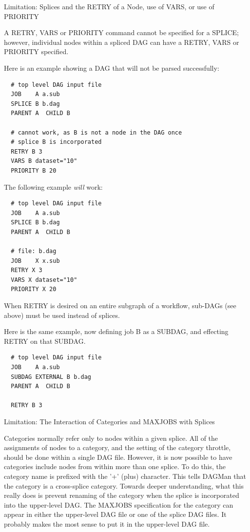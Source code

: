 \begin{description}
\item[Limitation: Splices and the RETRY of a Node, use of VARS, or use of PRIORITY]
\end{description}

A RETRY, VARS or PRIORITY command cannot be specified for a SPLICE;
however, individual nodes within a spliced DAG can have a RETRY, VARS
or PRIORITY specified.

Here is an example showing a DAG that will not be parsed successfully:
\begin{verbatim}
  # top level DAG input file
  JOB    A a.sub
  SPLICE B b.dag
  PARENT A  CHILD B

  # cannot work, as B is not a node in the DAG once
  # splice B is incorporated
  RETRY B 3
  VARS B dataset="10"
  PRIORITY B 20
\end{verbatim}

The following example \emph{will} work:
\begin{verbatim}
  # top level DAG input file
  JOB    A a.sub
  SPLICE B b.dag
  PARENT A  CHILD B

  # file: b.dag
  JOB    X x.sub
  RETRY X 3
  VARS X dataset="10"
  PRIORITY X 20
\end{verbatim}

When RETRY is desired on an entire subgraph of a workflow,
sub-DAGs (see above) must be used instead of splices.

Here is the same example, now defining job B as a SUBDAG,
and effecting RETRY on that SUBDAG.
\begin{verbatim}
  # top level DAG input file
  JOB    A a.sub
  SUBDAG EXTERNAL B b.dag
  PARENT A  CHILD B

  RETRY B 3
\end{verbatim}

\begin{description}
\item[Limitation: The Interaction of Categories and MAXJOBS with Splices]
\end{description}

Categories normally refer only to nodes within a
given splice.
All of the assignments of nodes to a category, and the
setting of the category throttle, should be done within a single DAG file.
However, it is now possible to have categories include nodes
from within more than one splice.
To do this, the category name is prefixed with the '+' (plus) character.
This tells DAGMan that the category is
a cross-splice category.
Towards deeper understanding,
what this really does is prevent renaming
of the category when the splice is incorporated into the upper-level DAG.
The MAXJOBS specification for the category can appear in either the
upper-level DAG file or one of the splice DAG files.
It probably
makes the most sense to put it in the upper-level DAG file.

